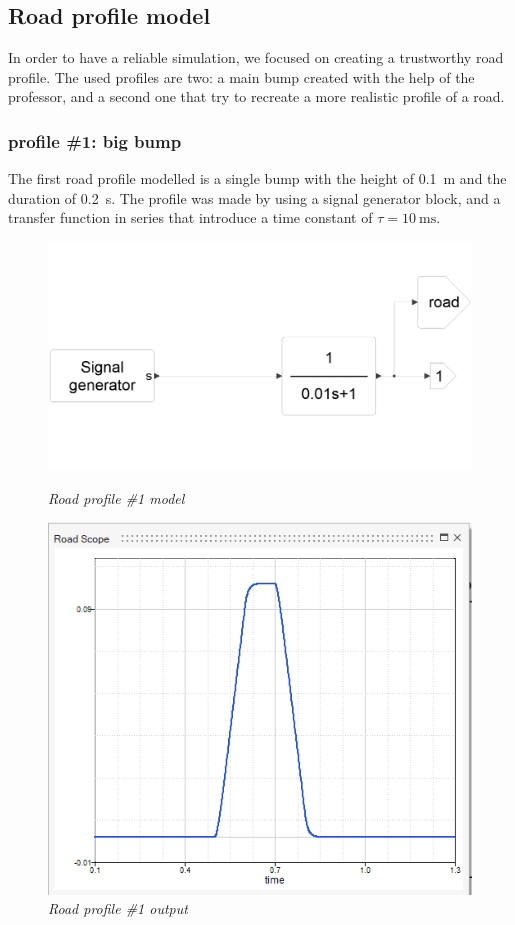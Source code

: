 \documentclass{article}
\numberwithin{equation}{section}
\numberwithin{figure}{section}
\numberwithin{table}{section}
\numberwithin{table}{section}
\begin{document}
\subsection{Road profile model}
In order to have a reliable simulation, we focused on creating a trustworthy road profile. The used profiles are two: a main bump created with the help of the professor, and a second one that try to recreate a more realistic profile of a road.
\subsubsection{profile \#1: big bump}
The first road profile modelled is a single bump with the height of \SI{0.1}{\metre} and the duration of \SI{0.2}{\second}. The profile was made by using a signal generator block, and a transfer function in series that introduce a time constant of $\tau=\SI{10}{\milli\second}$.
\begin{figure}[H]
\centering
\begin{minipage}{.55\textwidth}
  \centering
  \includegraphics[width=.9\linewidth]{Pictures/big_bump_model.png}
  \caption{\emph{Road profile \#1 model}}
  \label{fig:1bump_model}
\end{minipage}%
\begin{minipage}{.45\textwidth}
  \centering
  \includegraphics[width=.9\linewidth]{Pictures/big_bump_output.png}
  \caption{\emph{Road profile \#1 output}}
  \label{fig:1bump_output}
\end{minipage}
\end{figure}
\end{document}

